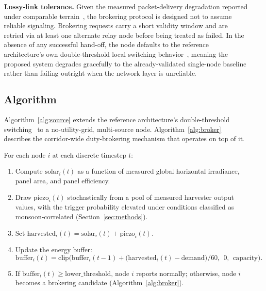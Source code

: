 \documentclass[electronics,article,submit,moreauthors]{Definitions/mdpi}
\begin{document}
\textbf{Lossy-link tolerance.} Given the measured packet-delivery degradation reported under comparable terrain~\cite{ref28,ref92}, the brokering protocol is designed not to assume reliable signaling. Brokering requests carry a short validity window and are retried via at least one alternate relay node before being treated as failed. In the absence of any successful hand-off, the node defaults to the reference architecture's own double-threshold local switching behavior~\cite{ref101}, meaning the proposed system degrades gracefully to the already-validated single-node baseline rather than failing outright when the network layer is unreliable.

\subsection{Algorithm}

Algorithm~\ref{alg:source} extends the reference architecture's double-threshold switching~\cite{ref101} to a no-utility-grid, multi-source node. Algorithm~\ref{alg:broker} describes the corridor-wide duty-brokering mechanism that operates on top of it.

\begin{Theorem}
\label{alg:source}
For each node $i$ at each discrete timestep $t$:
\begin{enumerate}
\item Compute $\mathrm{solar}_i(t)$ as a function of measured global horizontal irradiance, panel area, and panel efficiency.
\item Draw $\mathrm{piezo}_i(t)$ stochastically from a pool of measured harvester output values, with the trigger probability elevated under conditions classified as monsoon-correlated (Section~\ref{sec:methods}).
\item Set $\mathrm{harvested}_i(t) = \mathrm{solar}_i(t) + \mathrm{piezo}_i(t)$.
\item Update the energy buffer:
\[
\mathrm{buffer}_i(t) = \mathrm{clip}\Big(\mathrm{buffer}_i(t{-}1) + \big(\mathrm{harvested}_i(t) - \mathrm{demand}\big)/60,\ \ 0,\ \ \mathrm{capacity}\Big).
\]
\item If $\mathrm{buffer}_i(t) \geq \mathrm{lower\_threshold}$, node $i$ reports normally; otherwise, node $i$ becomes a brokering candidate (Algorithm~\ref{alg:broker}).
\end{enumerate}
\end{Theorem}
\end{document}
